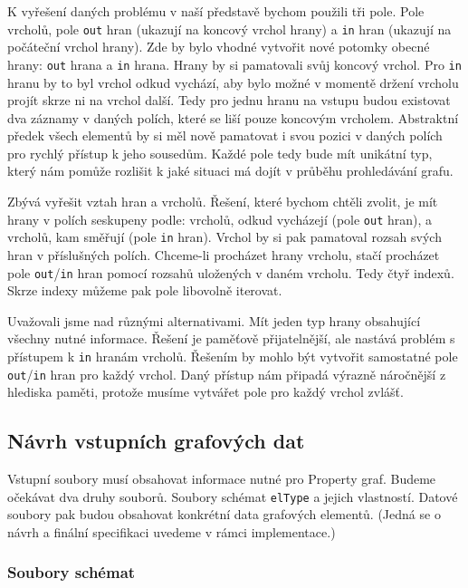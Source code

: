 K vyřešení daných problému v naší představě bychom použili tři pole.
Pole vrcholů, pole \texttt{out} hran (ukazují na koncový vrchol hrany) a \texttt{in} hran (ukazují na počáteční vrchol hrany). 
Zde by bylo vhodné vytvořit nové potomky obecné hrany: \texttt{out} hrana a \texttt{in} hrana.
Hrany by si pamatovali svůj koncový vrchol.
Pro \texttt{in} hranu by to byl vrchol odkud vychází, aby bylo možné v momentě držení vrcholu projít skrze ni na vrchol další.
Tedy pro jednu hranu na vstupu budou existovat dva záznamy v daných polích, které se liší pouze koncovým vrcholem.
Abstraktní předek všech elementů by si měl nově pamatovat i svou pozici v daných polích pro rychlý přístup k jeho sousedům.
Každé pole tedy bude mít unikátní typ, který nám pomůže rozlišit k jaké situaci má dojít v průběhu prohledávání grafu.

Zbývá vyřešit vztah hran a vrcholů.
Řešení, které bychom chtěli zvolit, je mít hrany v polích seskupeny podle: vrcholů, odkud vycházejí (pole \texttt{out} hran), a  vrcholů, kam směřují (pole \texttt{in} hran).
Vrchol by si pak pamatoval rozsah svých hran v příslušných polích. 
Chceme-li procházet hrany vrcholu, stačí procházet pole \texttt{out}/\texttt{in} hran pomocí rozsahů uložených v daném vrcholu.
Tedy čtyř indexů.
Skrze indexy můžeme pak pole libovolně iterovat.

Uvažovali jsme nad různými alternativami. 
Mít jeden typ hrany obsahující všechny nutné informace.
Řešení je paměťově přijatelnější, ale nastává problém s přístupem k \texttt{in} hranám vrcholů.
Řešením by mohlo být vytvořit samostatné pole \texttt{out}/\texttt{in} hran pro každý vrchol. 
Daný přístup nám připadá výrazně náročnější z hlediska paměti, protože musíme vytvářet pole pro každý vrchol zvlášť. 

\subsection{Návrh vstupních grafových dat} \label{anal.vstup}

Vstupní soubory musí obsahovat informace nutné pro Property graf.
Budeme očekávat dva druhy souborů.
Soubory schémat \texttt{elType} a jejich vlastností.
Datové soubory pak budou obsahovat konkrétní data grafových elementů.
(Jedná se o návrh a finální specifikaci uvedeme v rámci implementace.)

\subsubsection{Soubory schémat} 

